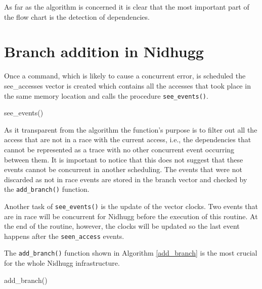 As far as the algorithm is concerned it is clear that the most important part of the flow chart is the detection of dependencies. 


\section{Branch addition in Nidhugg}

Once a command, which is likely to cause a concurrent error, is scheduled the see\_accesses vector is created which
contains all the accesses that took place in the same memory location and calls the procedure \verb|see_events()|.

\begin{algorithm}
    \caption{see\_events()}
\end{algorithm}

As it transparent from the algorithm the function's purpose is to filter out all the access that are not in a race with
the current access, i.e., the dependencies that cannot be represented as a trace with no other concurrent event
occurring between them. It is important to notice that this does not suggest that these events cannot be concurrent in
another scheduling. The events that were not discarded as not in race events are stored in the branch vector and checked
by the \verb|add_branch()| function.

Another task of \verb|see_events()| is the update of the vector clocks. Two events that are in race will be concurrent
for Nidhugg before the execution of this routine. At the end of the routine, however, the clocks will be updated so the
last event happens after the \verb|seen_access| events.

The \verb|add_branch()| function shown in Algorithm \ref{add_branch} is the most crucial for the whole Nidhugg infrastructure.

\begin{algorithm}
    \caption{add\_branch()}
    \label{add_branch}
\end{algorithm}

